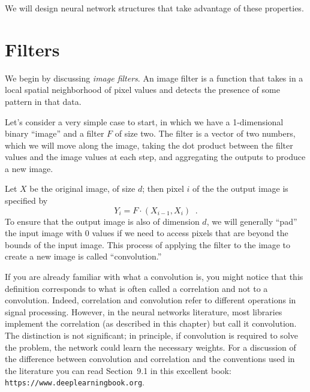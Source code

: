 We will design neural network structures that take advantage of these
properties.

\pagebreak
\section{Filters}
We begin by discussing {\em image filters}.  An image filter is a
function that takes in a local spatial neighborhood of pixel values
and detects the presence of some pattern in that data.

Let's consider a very simple case to start, in which we have a
1-dimensional binary ``image'' and a filter $F$ of size two.  The
filter is a vector of two numbers, which we will move along the image,
taking the dot product between the filter values and the image values
at each step, and aggregating the outputs to produce a new image.

Let $X$ be the original image, of size $d$; then pixel $i$ of the the
output image is specified by
\[Y_i = F \cdot  (X_{i-1}, X_i)\;\;.\]
To ensure that the output
image is also of dimension $d$, we will generally ``pad'' the input
image with 0 values if we need to access pixels that are beyond the
bounds of the input image.  This process of applying the filter to the
image to create a new image is called ``convolution.''

If you are already familiar with what a convolution is, you might
notice that this definition corresponds to what is often called a
correlation and not to a convolution. Indeed, correlation and
convolution refer to different operations in signal
processing. However, in the neural networks literature, most libraries
implement the correlation (as described in this chapter) but call it
convolution. The distinction is not significant; in principle, if
convolution is required to solve the problem, the network could learn
the necessary weights.
For a discussion of the difference between convolution
and correlation and the conventions used in the literature you can
read Section~9.1 in this excellent book: {\tt
https://www.deeplearningbook.org}.

